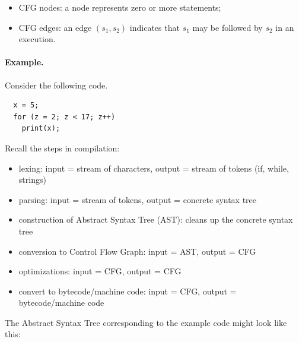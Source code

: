 \documentclass[11pt]{article}
\begin{document}
\begin{itemize}
\item CFG nodes: a node represents zero or more statements;
\item CFG edges: an edge $(s_1, s_2)$ indicates that $s_1$ may
  be followed by $s_2$ in an execution.
\end{itemize}

\paragraph{Example.} Consider the following code.
\begin{lstlisting}
  x = 5;
  for (z = 2; z < 17; z++)
    print(x);
\end{lstlisting}

Recall the steps in compilation:
\begin{itemize}
\item lexing: input = stream of characters, output = stream of tokens (if, while, strings)
\item parsing: input = stream of tokens, output = concrete syntax tree
\item construction of Abstract Syntax Tree (AST): cleans up the concrete syntax tree
\item conversion to Control Flow Graph: input = AST, output = CFG
\item optimizations: input = CFG, output = CFG
\item convert to bytecode/machine code: input = CFG, output = bytecode/machine code
\end{itemize}

The Abstract Syntax Tree corresponding to the example code might look like this:

\begin{center}
\end{center}
\end{document}
